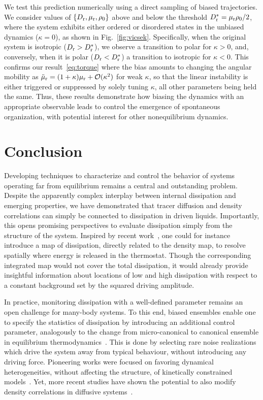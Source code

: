 \documentclass[superscriptaddress, twocolumn, prx, longbibliography, nofootinbib]{revtex4-1}
\begin{document}
We test this prediction numerically using a direct sampling of biased trajectories. We consider values of $\{D_{\rm r},\mu_{\rm r},\rho_0\}$ above and below the threshold $D_{\rm r}^*=\mu_{\rm r}\rho_0/2$, where the system exhibits either ordered or disordered states in the unbiased dynamics ($\kappa=0$), as shown in Fig.~\ref{fig:vicsek}. Specifically, when the original system is isotropic ($D_{\rm r}>D_{\rm r}^*$), we observe a transition to polar for $\kappa>0$, and, conversely, when it is polar ($D_{\rm r}<D_{\rm r}^*$) a transition to isotropic for $\kappa<0$. This confirms our result~\eqref{eq:torque} where the bias amounts to changing the angular mobility as $\tilde\mu_{\rm r}=(1+\kappa)\mu_{\rm r} + {\cal O}(\kappa^2)$ for weak $\kappa$, so that the linear instability is either triggered or suppressed by solely tuning $\kappa$, all other parameters being held the same. Thus, these results demonstrate how biasing the dynamics with an appropriate observable leads to control the emergence of spontaneous organization, with potential interest for other nonequilibrium dynamics.




\section{Conclusion}

Developing techniques to characterize and control the behavior of systems operating far from equilibrium remains a central and outstanding problem. Despite the apparently complex interplay between internal dissipation and emerging properties, we have demonstrated that tracer diffusion and density correlations can simply be connected to dissipation in driven liquids. Importantly, this opens promising perspectives to evaluate dissipation simply from the structure of the system. Inspired by recent work~\cite{Nardini2017}, one could for instance introduce a map of dissipation, directly related to the density map, to resolve spatially where energy is released in the thermostat. Though the corresponding integrated map would not cover the total dissipation, it would already provide insightful information about locations of low and high dissipation with respect to a constant background set by the squared driving amplitude.


In practice, monitoring dissipation with a well-defined parameter remains an open challenge for many-body systems. To this end, biased ensembles enable one to specify the statistics of dissipation by introducing an additional control parameter, analogously to the change from micro-canonical to canonical ensemble in equilibrium thermodynamics~\cite{Chetrite2013, Jack2010}. This is done by selecting rare noise realizations which drive the system away from typical behaviour, without introducing any driving force. Pioneering works were focused on favoring dynamical heterogeneities, without affecting the structure, of kinetically constrained models~\cite{garrahan2007, Hedges2009, Pitard2011, Speck2012, Bodineau2012a}. Yet, more recent studies have shown the potential to also modify density correlations in diffusive systems~\cite{Jack2014, Cagnetta2017, Nemoto2019}.
\end{document}

